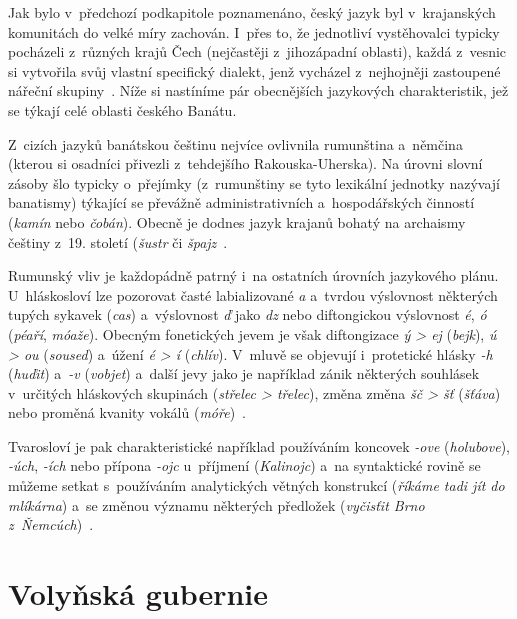 Jak bylo v~předchozí podkapitole poznamenáno, český jazyk byl v~krajanských komunitách do velké míry zachován. I~přes to, že jednotliví vystěhovalci typicky pocházeli z~různých krajů Čech (nejčastěji z~jihozápadní oblasti), každá z~vesnic si vytvořila svůj vlastní specifický dialekt, jenž vycházel z~nejhojněji zastoupené nářeční skupiny~\parencite{Gecse2013}. Níže si nastíníme pár obecnějších jazykových charakteristik, jež se týkají celé oblasti českého Banátu.

Z~cizích jazyků banátskou češtinu nejvíce ovlivnila rumunština a~němčina (kterou si osadníci přivezli z~tehdejšího Rakouska-Uherska). Na úrovni slovní zásoby šlo typicky o~přejímky (z~rumunštiny se tyto lexikální jednotky nazývají banatismy) týkající se převážně administrativních a~hospodářských činností (\emph{kamín} nebo \emph{čobán}). Obecně je dodnes jazyk krajanů bohatý na archaismy češtiny z~19. století (\emph{šustr} či \emph{špajz}~\parencite{Frnochova2012}.

Rumunský vliv je každopádně patrný i~na ostatních úrovních jazykového plánu. U~hláskosloví lze pozorovat časté labializované \emph{a} a~tvrdou výslovnost některých tupých sykavek (\emph{cas}) a~výslovnost \emph{ď }jako \emph{dz} nebo diftongickou výslovnost \emph{é}, \emph{ó} (\emph{péaří}, \emph{móaže}). Obecným fonetických jevem je však diftongizace \emph{ý \textgreater{} ej} (\emph{bejk}), \emph{ú \textgreater{} ou} (\emph{soused}) a~úžení \emph{é \textgreater{} í} (\emph{chlív}). V~mluvě se objevují i~protetické hlásky \emph{-h} (\emph{huďit}) a~\emph{-v} (\emph{vobjet}) a~další jevy jako je například zánik některých souhlásek v~určitých hláskových skupinách (\emph{střelec \textgreater{} třelec}), změna změna \emph{šč \textgreater{} šť} (\emph{šťáva}) nebo proměná kvanity vokálů (\emph{móře})~\parencite{Skulina1976}.

Tvarosloví je pak charakteristické například používáním koncovek \emph{-ove} (\emph{holubove}), \emph{-úch}, \emph{-ích} nebo přípona \emph{-ojc} u~příjmení (\emph{Kalinojc}) a~na syntaktické rovině se můžeme setkat s~používáním analytických větných konstrukcí (\emph{říkáme tadi jít do mlíkárna}) a~se změnou významu některých předložek (\emph{vyčisťit Brno z~Ňemcúch})~\parencite{Skulina1976}.

\hypertarget{volyux148skuxe1-gubernie}{%
\section{Volyňská gubernie}\label{volyux148skuxe1-gubernie}}

